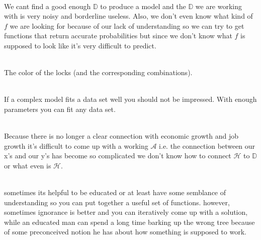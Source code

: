 \documentclass[12pt]{article}
\begin{document}
\begin{enumerate}
\\
We cant find a good enough $\mathbb{D}$ to produce a model and the $\mathbb{D}$ we are working with is very noisy and borderline useless. Also, we don't even know what kind of $f$ we are looking for because of our lack of understanding so we can try to get functions that return accurate probabilities but since we don't know what $f$ is supposed to look like it's very difficult to predict.

\\
The color of the locks (and the corresponding combinations).


\\
If a complex model fits a data set well you should not be impressed. With enough parameters you can fit any data set.

\\
Because there is no longer a clear connection with economic growth and job growth it's difficult to come up with a working $\mathcal{A}$ i.e. the connection between our x's and our y's has become so complicated we don't know how to connect $\mathcal{H}$ to $\mathbb{D}$ or what even is $\mathcal{H}$.

\\
sometimes its helpful to be educated or at least have some semblance of understanding so you can put together a useful set of functions. however, sometimes ignorance is better and you can iteratively come up with a solution, while an educated man can spend a long time barking up the wrong tree because of some preconceived notion he has about how something is supposed to work.


\end{enumerate}
\end{document}
